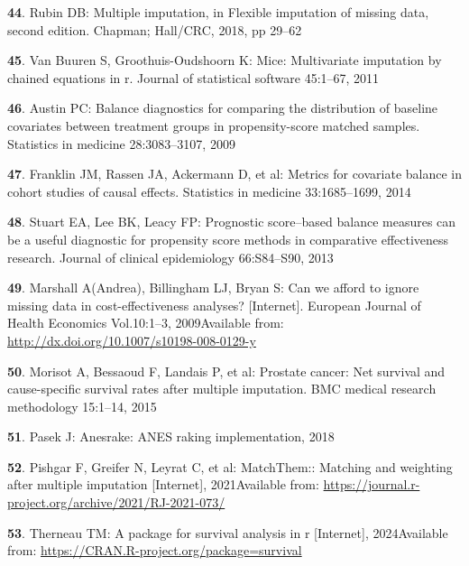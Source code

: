 \documentclass[
  letterpaper,
  DIV=11,
  numbers=noendperiod]{scrartcl}
\newlength{\cslhangindent}
\newenvironment{CSLReferences}[2] %
 {\begin{list}{}{%
  \setlength{\itemindent}{0pt}
  \setlength{\leftmargin}{0pt}
  \setlength{\parsep}{0pt}
  \ifodd #1
   \setlength{\leftmargin}{\cslhangindent}
   \setlength{\itemindent}{-1\cslhangindent}
  \fi
  \setlength{\itemsep}{#2\baselineskip}}}
 {\end{list}}
\begin{document}
\begin{CSLReferences}{0}{1}
\textbf{44}. Rubin DB: Multiple imputation, in Flexible imputation of
missing data, second edition. Chapman; Hall/CRC, 2018, pp 29--62

\textbf{45}. Van Buuren S, Groothuis-Oudshoorn K: Mice: Multivariate
imputation by chained equations in r. Journal of statistical software
45:1--67, 2011

\textbf{46}. Austin PC: Balance diagnostics for comparing the
distribution of baseline covariates between treatment groups in
propensity-score matched samples. Statistics in medicine 28:3083--3107,
2009

\textbf{47}. Franklin JM, Rassen JA, Ackermann D, et al: Metrics for
covariate balance in cohort studies of causal effects. Statistics in
medicine 33:1685--1699, 2014

\textbf{48}. Stuart EA, Lee BK, Leacy FP: Prognostic score--based
balance measures can be a useful diagnostic for propensity score methods
in comparative effectiveness research. Journal of clinical epidemiology
66:S84--S90, 2013

\textbf{49}. Marshall A(Andrea), Billingham LJ, Bryan S: Can we afford
to ignore missing data in cost-effectiveness analyses? {[}Internet{]}.
European Journal of Health Economics Vol.10:1--3, 2009Available from:
\url{http://dx.doi.org/10.1007/s10198-008-0129-y}

\textbf{50}. Morisot A, Bessaoud F, Landais P, et al: Prostate cancer:
Net survival and cause-specific survival rates after multiple
imputation. BMC medical research methodology 15:1--14, 2015

\textbf{51}. Pasek J: Anesrake: ANES raking implementation, 2018

\textbf{52}. Pishgar F, Greifer N, Leyrat C, et al: MatchThem:: Matching
and weighting after multiple imputation {[}Internet{]}, 2021Available
from: \url{https://journal.r-project.org/archive/2021/RJ-2021-073/}

\textbf{53}. Therneau TM: A package for survival analysis in r
{[}Internet{]}, 2024Available from:
\url{https://CRAN.R-project.org/package=survival}


\end{CSLReferences}
\end{document}
